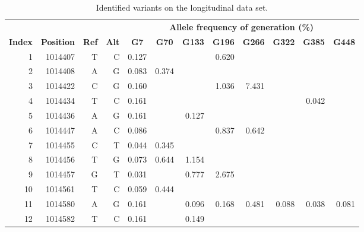 \documentclass{bmcart}
\begin{document}
\begin{table}[htbp]
  \centering
  \caption{Identified variants on the longitudinal data set.}\label{table:mutations}
  \begin{threeparttable}
  \tiny
    \begin{tabular}{rrrrrrrrrrrr}
    \toprule
          & \multicolumn{1}{c}{} & \multicolumn{1}{c}{} & \multicolumn{1}{c}{} & \multicolumn{8}{c}{\textbf{Allele frequency of generation (\%)}} \\
      \cmidrule(r{4pt}){5-12}
    \textbf{Index} & \textbf{Position} & \textbf{Ref} & \textbf{Alt} & \multicolumn{1}{c}{\textbf{G7}} & \multicolumn{1}{c}{\textbf{G70}} & \multicolumn{1}{c}{\textbf{G133}} & \multicolumn{1}{c}{\textbf{G196}} & \multicolumn{1}{c}{\textbf{G266}} & \multicolumn{1}{c}{\textbf{G322}} & \multicolumn{1}{c}{\textbf{G385}} & \multicolumn{1}{c}{\textbf{G448}} \\
    \midrule
    1     & 1014407 & T     & C     & 0.127 &       &       & 0.620 & \textbf{} & \textbf{} & \textbf{} & \textbf{} \\
    2     & 1014408 & A     & G     & 0.083 & 0.374 & \textbf{} & \textbf{} & \textbf{} & \textbf{} & \textbf{} & \textbf{} \\
    3     & 1014422 & C     & G     & 0.160 &       &       & 1.036 & 7.431 &       &       &  \\
    4     & 1014434 & T     & C     & 0.161 &       &       &       &       &       & 0.042 &  \\
    5     & 1014436 & A     & G     & 0.161 &       & 0.127 &       &       &       &       &  \\
    6     & 1014447 & A     & C     & 0.086 &       &       & 0.837 & 0.642 &       &       &  \\
    7     & 1014455 & C     & T     & 0.044 & 0.345 &       &       &       &       &       &  \\
    8     & 1014456 & T     & G     & 0.073 & 0.644 & 1.154 &       &       &       &       &  \\
    9     & 1014457 & G     & T     & 0.031 &       & 0.777 & 2.675 &       &       &       &  \\
    10    & 1014561 & T     & C     & 0.059 & 0.444 &       &       &       &       &       &  \\
    11    & 1014580 & A     & G     & 0.161 &       & 0.096 & 0.168 & 0.481 & 0.088 & 0.038 & 0.081 \\
    12    & 1014582 & T     & C     & 0.161 &       & 0.149 &       &       &       &       &  \\

\end{tabular}
\end{threeparttable}
\end{table}
\end{document}
